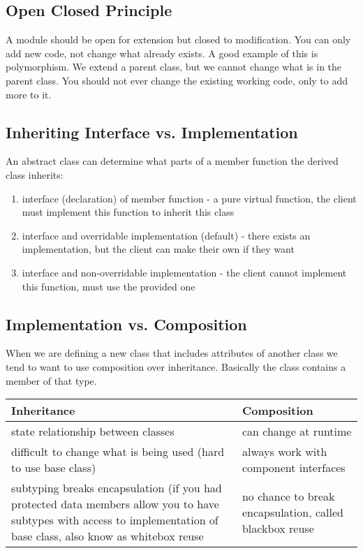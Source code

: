 \documentclass[12pt]{article}
\begin{document}
\subsection*{Open Closed Principle}
A module should be open for extension but closed to modification. You can only add new code, not change what already exists. A good example of this is polymorphism. We extend a parent class, but we cannot change what is in the parent class. You should not ever change the existing working code, only to add more to it.

\subsection*{Inheriting Interface vs. Implementation}
An abstract class can determine what parts of a member function the derived class inherits:
\begin{enumerate}
    \item interface (declaration) of member function - a pure virtual function, the client must implement this function to inherit this class
    \item interface and overridable implementation (default) - there exists an implementation, but the client can make their own if they want
    \item interface and non-overridable implementation - the client cannot implement this function, must use the provided one
\end{enumerate}

\subsection*{Implementation vs. Composition}
When we are defining a new class that includes attributes of another class we tend to want to use composition over inheritance. Basically the class contains a member of that type.

\begin{tabular}{|p{9cm} | p{9cm}|}
\hline
\textbf{Inheritance} & \textbf{Composition}\\
\hline
state relationship between classes & can change at runtime\\
\hline
difficult to change what is being used (hard to use base class) & always work with component interfaces\\
\hline
subtyping breaks encapsulation (if you had protected data members allow you to have subtypes with access to implementation of base class, also know as whitebox reuse& no chance to break encapsulation, called blackbox reuse\\
\hline
\end{tabular}
\end{document}
